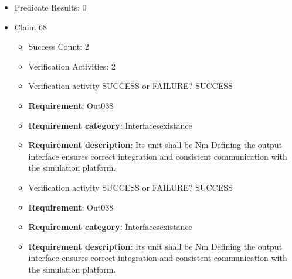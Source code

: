 \documentclass{article}
\begin{document}
\begin{itemize}
\begin{itemize}
						\item \textbf{Requirement}: Out037 
						\item \textbf{Requirement category}: Interfacesexistance 
						\item \textbf{Requirement description}: Its unit shall be noUnit Defining the output interface ensures correct integration and consistent communication with the simulation platform.
					
					\item Verification activity SUCCESS or FAILURE? SUCCESS
		
						\item \textbf{Requirement}: Out037 
						\item \textbf{Requirement category}: Interfacesexistance 
						\item \textbf{Requirement description}: Its unit shall be noUnit Defining the output interface ensures correct integration and consistent communication with the simulation platform.
					
				\end{itemize}
				
									    
				\item Predicate Results: 0

  				  \item Claim 68
				\begin{itemize}
			    	\item Success Count: 2 
			    	\item Verification Activities: 2
					\item Verification activity SUCCESS or FAILURE? SUCCESS
		
						\item \textbf{Requirement}: Out038 
						\item \textbf{Requirement category}: Interfacesexistance 
						\item \textbf{Requirement description}: Its unit shall be Nm Defining the output interface ensures correct integration and consistent communication with the simulation platform.
					
					\item Verification activity SUCCESS or FAILURE? SUCCESS
		
						\item \textbf{Requirement}: Out038 
						\item \textbf{Requirement category}: Interfacesexistance 
						\item \textbf{Requirement description}: Its unit shall be Nm Defining the output interface ensures correct integration and consistent communication with the simulation platform.
					

\end{itemize}
\end{itemize}
\end{document}
